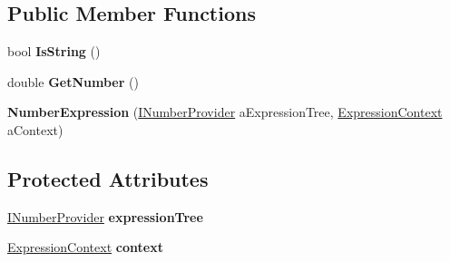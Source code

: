 \subsection*{Public Member Functions}
\begin{DoxyCompactItemize}
\item 
bool {\bfseries Is\+String} ()\hypertarget{class_b83_1_1_logic_expression_parser_1_1_number_expression_aee29905d3982be1a5090ac62dd4b9937}{}\label{class_b83_1_1_logic_expression_parser_1_1_number_expression_aee29905d3982be1a5090ac62dd4b9937}

\item 
double {\bfseries Get\+Number} ()\hypertarget{class_b83_1_1_logic_expression_parser_1_1_number_expression_ab26468a4200bf6ed4472d9d23780b26d}{}\label{class_b83_1_1_logic_expression_parser_1_1_number_expression_ab26468a4200bf6ed4472d9d23780b26d}

\item 
{\bfseries Number\+Expression} (\hyperlink{interface_b83_1_1_logic_expression_parser_1_1_i_number_provider}{I\+Number\+Provider} a\+Expression\+Tree, \hyperlink{class_b83_1_1_logic_expression_parser_1_1_expression_context}{Expression\+Context} a\+Context)\hypertarget{class_b83_1_1_logic_expression_parser_1_1_number_expression_a205dadd9dc9f15801d05a3a30a04b999}{}\label{class_b83_1_1_logic_expression_parser_1_1_number_expression_a205dadd9dc9f15801d05a3a30a04b999}

\end{DoxyCompactItemize}
\subsection*{Protected Attributes}
\begin{DoxyCompactItemize}
\item 
\hyperlink{interface_b83_1_1_logic_expression_parser_1_1_i_number_provider}{I\+Number\+Provider} {\bfseries expression\+Tree}\hypertarget{class_b83_1_1_logic_expression_parser_1_1_number_expression_a780c661c6925670144d82ac1117ae620}{}\label{class_b83_1_1_logic_expression_parser_1_1_number_expression_a780c661c6925670144d82ac1117ae620}

\item 
\hyperlink{class_b83_1_1_logic_expression_parser_1_1_expression_context}{Expression\+Context} {\bfseries context}\hypertarget{class_b83_1_1_logic_expression_parser_1_1_number_expression_a83afae0245d70f6fa1aa96b3ab9147b8}{}\label{class_b83_1_1_logic_expression_parser_1_1_number_expression_a83afae0245d70f6fa1aa96b3ab9147b8}

\end{DoxyCompactItemize}
